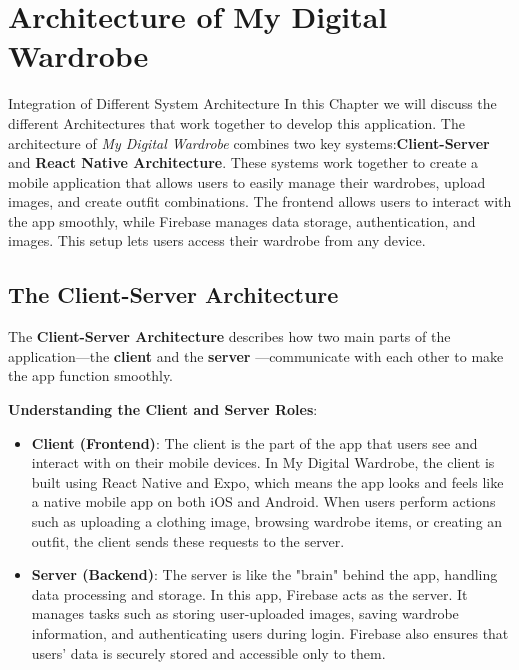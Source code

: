 \chapter{Architecture of My Digital Wardrobe}
\label{chap:Chapter4}

{Integration of Different System Architecture}
In this Chapter we will discuss the different Architectures that work together to develop this application. 
 The architecture of \textit{My Digital Wardrobe} combines two key systems:\textbf{Client-Server} and \textbf{React Native Architecture}. These systems work together to create a mobile application that allows users to easily manage their wardrobes, upload images, and create outfit combinations. The frontend allows users to interact with the app smoothly, while Firebase manages data storage, authentication, and images. This setup lets users access their wardrobe from any device.
 

\section{The Client-Server Architecture}

The \textbf{Client-Server Architecture } 
describes how two main parts of the application—the \textbf{client} and the \textbf{server} —communicate with each other to make the app function smoothly.

\noindent \textbf{Understanding the Client and Server Roles}:
\begin{itemize}
    \item \textbf{Client (Frontend)}: The client is the part of the app that users see and interact with on their mobile devices. In My Digital Wardrobe, the client is built using React Native and Expo, which means the app looks and feels like a native mobile app on both iOS and Android. When users perform actions such as uploading a clothing image, browsing wardrobe items, or creating an outfit, the client sends these requests to the server.
    \item \textbf{Server (Backend)}: The server is like the "brain" behind the app, handling data processing and storage. In this app, Firebase acts as the server. It manages tasks such as storing user-uploaded images, saving wardrobe information, and authenticating users during login. Firebase also ensures that users’ data is securely stored and accessible only to them.
    
\end{itemize}

